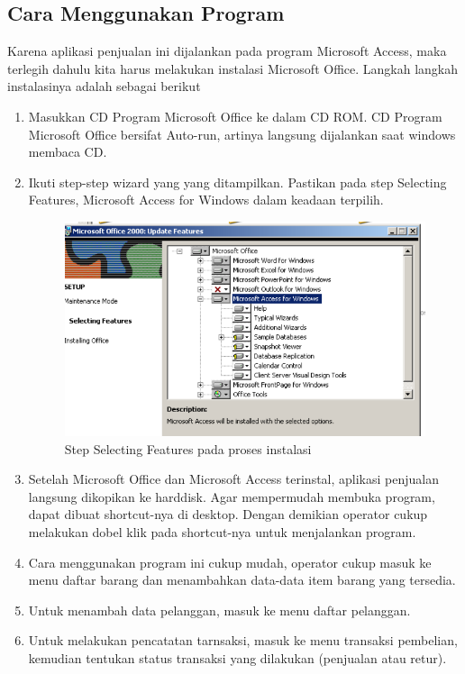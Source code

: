 \documentclass{article}
\begin{document}
\subsection{Cara Menggunakan Program}
Karena aplikasi penjualan ini dijalankan pada program Microsoft Access, maka terlegih dahulu kita harus melakukan instalasi Microsoft Office. Langkah langkah instalasinya adalah sebagai berikut
\begin{enumerate}
    \item Masukkan CD Program Microsoft Office ke dalam CD ROM. CD Program Microsoft Office bersifat Auto-run, artinya langsung dijalankan saat windows membaca CD.
    \item Ikuti step-step wizard yang yang ditampilkan. Pastikan pada step Selecting Features, Microsoft Access for Windows dalam keadaan terpilih.
    \newpage
    \begin{figure}[htp]
        \centering
        \includegraphics[width=12cm]{gambar_4_10.png}
        \caption{Step Selecting Features pada proses instalasi}
        \label{fig:410}
    \end{figure}
    \item Setelah Microsoft Office dan Microsoft Access terinstal, aplikasi penjualan langsung dikopikan ke harddisk. Agar mempermudah membuka program, dapat dibuat shortcut-nya di desktop. Dengan demikian operator cukup melakukan dobel klik pada shortcut-nya untuk menjalankan program.
    \item Cara menggunakan program ini cukup mudah, operator cukup masuk ke menu daftar barang dan menambahkan data-data item barang yang tersedia.
    \item Untuk menambah data pelanggan, masuk ke menu daftar pelanggan.
    \item Untuk melakukan pencatatan tarnsaksi, masuk ke menu transaksi pembelian, kemudian tentukan status transaksi yang dilakukan (penjualan atau retur).
\end{enumerate}
\end{document}
